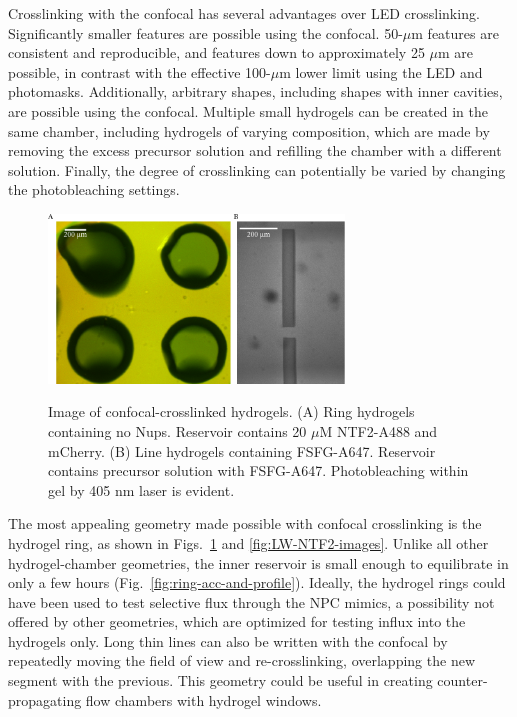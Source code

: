 
Crosslinking with the confocal has several advantages over LED crosslinking.  Significantly smaller features are possible using the confocal.  50-$\mu$m features are consistent and reproducible, and features down to approximately 25 $\mu$m are possible, in contrast with the effective 100-$\mu$m lower limit using the LED and photomasks.  Additionally, arbitrary shapes, including shapes with inner cavities, are possible using the confocal.  Multiple small hydrogels can be created in the same chamber, including hydrogels of varying composition, which are made by removing the excess precursor solution and refilling the chamber with a different solution.  Finally, the degree of crosslinking can potentially be varied by changing the photobleaching settings.

\begin{figure} %
\caption[Confocal-crosslinked hydrogels.]{Image of confocal-crosslinked hydrogels. (A) Ring hydrogels containing no Nups.  Reservoir contains 20 $\mu$M NTF2-A488 and mCherry. (B) Line hydrogels containing FSFG-A647. Reservoir contains precursor solution with FSFG-A647. Photobleaching within gel by 405 nm laser is evident.}
\centering
\includegraphics[width=0.7\textwidth]{figs/ch03/example-LW-gels}
\label{fig:LW-gel-images}
\end{figure} %

The most appealing geometry made possible with confocal crosslinking is the hydrogel ring, as shown in Figs.~\ref{fig:LW-gel-images} and \ref{fig:LW-NTF2-images}.  Unlike all other hydrogel-chamber geometries, the inner reservoir is small enough to equilibrate in only a few hours (Fig.~\ref{fig:ring-acc-and-profile}).  Ideally, the hydrogel rings could have been used to test selective flux through the NPC mimics, a possibility not offered by other  geometries, which are optimized for testing influx into the hydrogels only.  Long thin lines can also be written with the confocal by repeatedly moving the field of view and re-crosslinking, overlapping the new segment with the previous.  This geometry could be useful in creating counter-propagating flow chambers with hydrogel windows.

